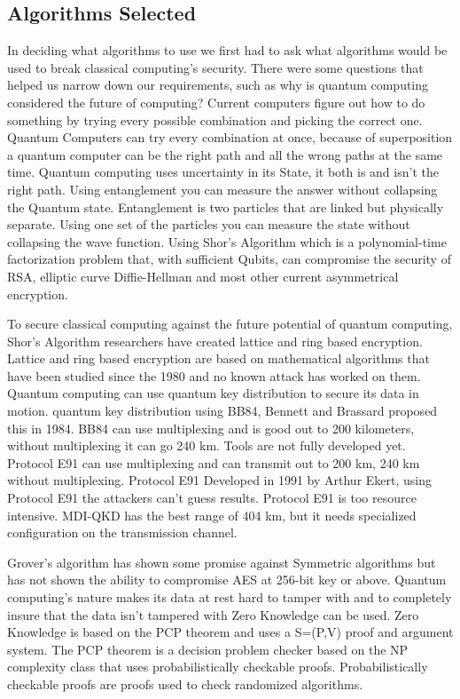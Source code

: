 \documentclass[sigconf]{acmart}
\begin{document}
\subsection{Algorithms Selected}
In deciding what algorithms to use we first had to ask what algorithms would be used to break classical computing’s security. There were some questions that helped us narrow down our requirements, such as why is quantum computing considered the future of computing?  Current computers figure out how to do something by trying every possible combination and picking the correct one. Quantum Computers can try every combination at once, because of superposition a quantum computer can be the right path and all the wrong paths at the same time. Quantum computing uses uncertainty in its State, it both is and isn’t the right path. Using entanglement you can measure the answer without collapsing the Quantum state. Entanglement is two particles that are linked but physically separate. Using one set of the particles you can measure the state without collapsing the wave function. Using Shor’s Algorithm which is a polynomial-time factorization problem that, with sufficient Qubits, can compromise the security of RSA, elliptic curve Diffie-Hellman and most other current asymmetrical encryption. 

To secure classical computing against the future potential of quantum computing, Shor’s Algorithm researchers have created lattice and ring based encryption. Lattice and ring based encryption are based on mathematical algorithms that have been studied since the 1980 and no known attack has worked on them. Quantum computing can use quantum key distribution to secure its data in motion. quantum key distribution using BB84, Bennett and Brassard proposed this in 1984. BB84 can use multiplexing and is good out to 200 kilometers, without multiplexing it can go 240 km. Tools are not fully developed yet. Protocol E91 can use multiplexing and can transmit out to 200 km, 240 km without multiplexing. Protocol E91 Developed in 1991 by Arthur Ekert, using Protocol E91 the attackers can’t guess results. Protocol E91 is too resource intensive. MDI-QKD has the best range of 404 km, but it needs specialized configuration on the transmission channel. 

Grover’s algorithm has shown some promise against Symmetric algorithms but has not shown the ability to compromise AES at 256-bit key or above. Quantum computing’s nature makes its data at rest hard to tamper with and to completely insure that the data isn’t tampered with Zero Knowledge can be used. Zero Knowledge is based on the PCP theorem and uses a S=(P,V) proof and argument system. The PCP theorem is a decision problem checker based on the NP complexity class that uses probabilistically checkable proofs. Probabilistically checkable proofs are proofs used to check randomized algorithms. 
\end{document}
